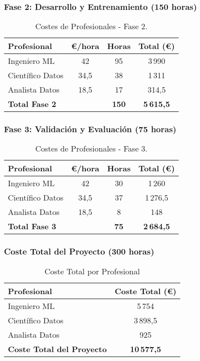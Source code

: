\subsubsection*{Fase 2: Desarrollo y Entrenamiento (150 horas)}
\begin{table}[H]
\centering
\begin{tabular}{|l|c|c|c|}
\toprule
Profesional & €/hora & Horas & Total (€) \\
\midrule
Ingeniero ML & 42 & 95 & 3\,990 \\
Científico Datos & 34,5 & 38 & 1\,311 \\
Analista Datos & 18,5 & 17 & 314,5 \\
\midrule
\textbf{Total Fase 2} & & \textbf{150} & \textbf{5\,615,5} \\
\bottomrule
\end{tabular}
\caption{Costes de Profesionales - Fase 2.}
\label{tab:costes_fase2}
\end{table}


\subsubsection*{Fase 3: Validación y Evaluación (75 horas)}
\begin{table}[H]
\centering
\begin{tabular}{|l|c|c|c|}
\toprule
Profesional & €/hora & Horas & Total (€) \\
\midrule
Ingeniero ML & 42 & 30 & 1\,260 \\
Científico Datos & 34,5 & 37 & 1\,276,5 \\
Analista Datos & 18,5 & 8 & 148 \\
\midrule
\textbf{Total Fase 3} & & \textbf{75} & \textbf{2\,684,5} \\
\bottomrule
\end{tabular}
\caption{Costes de Profesionales - Fase 3.}
\label{tab:costes_fase3}
\end{table}

\subsubsection*{Coste Total del Proyecto (300 horas)}
\begin{table}[H]
\centering
\begin{tabular}{|l|c|}
\toprule
Profesional & Coste Total (€) \\
\midrule
Ingeniero ML & 5\,754 \\
Científico Datos & 3\,898,5 \\
Analista Datos & 925 \\
\midrule
\textbf{Coste Total del Proyecto} & \textbf{10\,577,5} \\
\bottomrule
\end{tabular}
\caption{Coste Total por Profesional}
\label{tab:coste_total_profesional}
\end{table}


